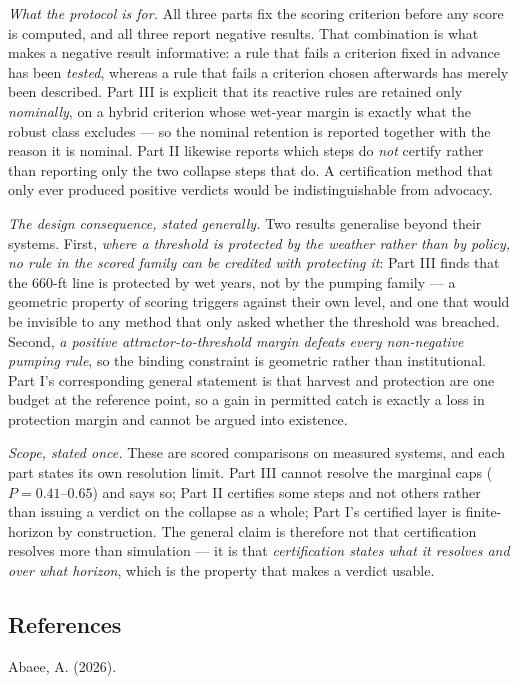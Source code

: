 \emph{What the protocol is for.} All three parts fix the scoring criterion before any score is
computed, and all three report negative results. That combination is what makes a negative result
informative: a rule that fails a criterion fixed in advance has been \emph{tested}, whereas a rule
that fails a criterion chosen afterwards has merely been described. Part III is explicit that its
reactive rules are retained only \emph{nominally}, on a hybrid criterion whose wet-year margin is
exactly what the robust class excludes --- so the nominal retention is reported together with the
reason it is nominal. Part II likewise reports which steps do \emph{not} certify rather than
reporting only the two collapse steps that do. A certification method that only ever produced
positive verdicts would be indistinguishable from advocacy.

\emph{The design consequence, stated generally.} Two results generalise beyond their systems. First,
\emph{where a threshold is protected by the weather rather than by policy, no rule in the scored
family can be credited with protecting it}: Part III finds that the 660-ft line is protected by wet
years, not by the pumping family --- a geometric property of scoring triggers against their own
level, and one that would be invisible to any method that only asked whether the threshold was
breached. Second, \emph{a positive attractor-to-threshold margin defeats every non-negative pumping
rule}, so the binding constraint is geometric rather than institutional. Part I's corresponding
general statement is that harvest and protection are one budget at the reference point, so a gain in
permitted catch is exactly a loss in protection margin and cannot be argued into existence.

\emph{Scope, stated once.} These are scored comparisons on measured systems, and each part states
its own resolution limit. Part III cannot resolve the marginal caps ($P = 0.41$--$0.65$) and says so;
Part II certifies some steps and not others rather than issuing a verdict on the collapse as a whole;
Part I's certified layer is finite-horizon by construction. The general claim is therefore not that
certification resolves more than simulation --- it is that \emph{certification states what it
resolves and over what horizon}, which is the property that makes a verdict usable.

\subsection*{References}
\label{references}
Abaee, A. (2026).


